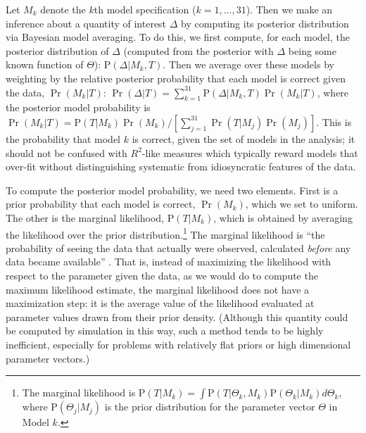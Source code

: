 \documentclass[11pt,titlepage]{article}
\renewcommand{\P}{\text{P}}
\begin{document}
Let $M_k$ denote the $k$th model specification ($k=1,\dots,31$). Then
we make an inference about a quantity of interest $\Delta$ by
computing its posterior distribution via Bayesian model averaging.  To
do this, we first compute, for each model, the posterior distribution
of $\Delta$ (computed from the posterior with $\Delta$ being some
known function of $\Theta$): $\P(\Delta|M_k,T)$.  Then we average over
these models by weighting by the relative posterior probability that
each model is correct given the data, $\Pr(M_k|T)$: $\Pr(\Delta|T) =
\sum_{k=1}^{31} \P(\Delta|M_k,T) \Pr(M_k|T)$, where the posterior
model probability is $\Pr(M_k|T)=\P(T|M_k)\Pr(M_k)/[\sum_{j=1}^{31}
\Pr(T|M_j) \Pr(M_j)]$.  This is the probability that model $k$ is
correct, given the set of models in the analysis; it should not be
confused with $R^2$-like measures which typically reward models that
over-fit without distinguishing systematic from idiosyncratic features
of the data.

To compute the posterior model probability, we need two elements.
First is a prior probability that each model is correct, $\Pr(M_k)$,
which we set to uniform.  The other is the marginal likelihood,
$\P(T|M_k)$, which is obtained by averaging the likelihood over the
prior distribution.\footnote{\label{eq:marglik}The marginal likelihood
  is $\P(T|M_k) = \int \P(T|\Theta_k, M_k) \P(\Theta_k|M_k)
  d\Theta_k$, where $\P(\Theta_j|M_j)$ is the prior distribution for
  the parameter vector $\Theta$ in Model $k$.}  The marginal
likelihood is ``the probability of seeing the data that actually were
observed, calculated \emph{before} any data became available''
\cite[p.776]{kass:raft:95}.  That is, instead of maximizing the
likelihood with respect to the parameter given the data, as we would
do to compute the maximum likelihood estimate, the marginal likelihood
does not have a maximization step: it is the average value of the
likelihood evaluated at parameter values drawn from their prior
density.  (Although this quantity could be computed by simulation in
this way, such a method tends to be highly inefficient, especially for
problems with relatively flat priors or high dimensional parameter
vectors.)
\end{document}
